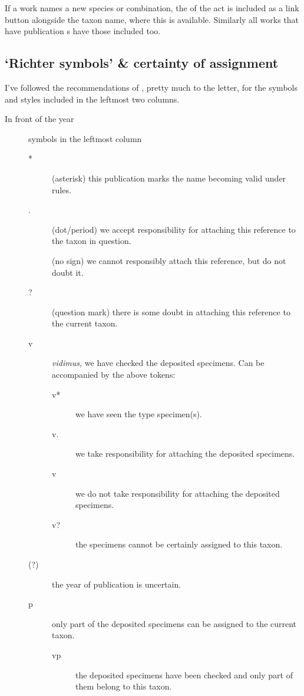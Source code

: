 If a work names a new species or combination, the  of the act is
included as a link button alongside the taxon
name,
where this is available. Similarly all works that have publication
s have those included too.


\subsection{‘Richter symbols’ \& certainty of assignment}%
\label{sub:richter-symbols}

I've followed the recommendations of \textcite{Matthews1973P}, pretty much to the
letter, for the symbols and styles included in the leftmost two columns.

\begin{description}
    \item[In front of the year] symbols in the leftmost column
    \begin{description}
        \item[*] (asterisk) this publication marks the name becoming valid under
             rules.
        \item[.] (dot/period) we accept responsibility for attaching this reference
            to the taxon in question.
        \item[] (no sign) we cannot responsibly attach this reference, but do not
            doubt it.
        \item[?] (question mark) there is some doubt in attaching this reference to
            the current taxon.
        \item[v] \emph{vidimus,} we have checked the deposited specimens. Can be
            accompanied by the above tokens:
            \begin{description}
                \item[v*] we have seen the type specimen(s).
                \item[v.] we take responsibility for attaching the deposited specimens.
                \item[v] we do not take responsibility for attaching the deposited
                    specimens.
                \item[v?] the specimens cannot be certainly assigned to this taxon.
            \end{description}
        \item[(?)] the year of publication is uncertain.
        \item[p] only part of the deposited specimens can be assigned to the current
            taxon.
            \begin{description}
                \item[vp] the deposited specimens have been checked and only part of
                    them belong to this taxon.
            \end{description}
    \end{description}


\end{description}
